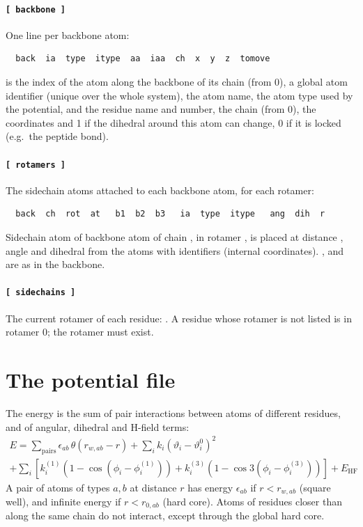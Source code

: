 \documentclass[11pt,a4paper]{article}
\begin{document}
\paragraph{\texttt{[ backbone ]}} One line per backbone atom:
\begin{Verbatim}
  back  ia  type  itype  aa  iaa  ch  x  y  z  tomove
\end{Verbatim}
 is the index of the atom along the backbone of its chain (from
0),  a global atom identifier (unique over the whole system),
 the atom name,  the atom type used by the potential,
 and  the residue name and number,  the chain (from
0),  the coordinates and  1 if the dihedral around
this atom can change, 0 if it is locked (e.g.\ the peptide bond).

\paragraph{\texttt{[ rotamers ]}} The sidechain atoms attached to each backbone
atom, for each rotamer:
\begin{Verbatim}
  back  ch  rot  at   b1  b2  b3   ia  type  itype   ang  dih  r
\end{Verbatim}
Sidechain atom  of backbone atom  of chain , in
rotamer , is placed at distance , angle  and
dihedral  from the atoms with identifiers  (internal
coordinates). ,  and  are as in the backbone.

\paragraph{\texttt{[ sidechains ]}} The current rotamer of each residue:
. A residue whose rotamer is not listed is in rotamer 0;
the rotamer must exist.

\section{The potential file}
\label{sec:pot}

The energy is the sum of pair interactions between atoms of different
residues, and of angular, dihedral and H-field terms:
\begin{multline*}
E = \sum_{\text{pairs}} \epsilon_{ab}\,\theta(r_{w,ab} - r)
 + \sum_i k_i(\vartheta_i-\vartheta_i^0)^2 \\
 + \sum_i \left[ k^{(1)}_i\left(1-\cos(\phi_i-\phi^{(1)}_i)\right)
               + k^{(3)}_i\left(1-\cos 3(\phi_i-\phi^{(3)}_i)\right)\right]
 + E_{\text{HF}}
\end{multline*}
A pair of atoms of types $a,b$ at distance $r$ has energy
$\epsilon_{ab}$ if $r<r_{w,ab}$ (square well), and infinite energy if
$r<r_{0,ab}$ (hard core). Atoms of residues closer than  along
the same chain do not interact, except through the global hard core.
\end{document}
